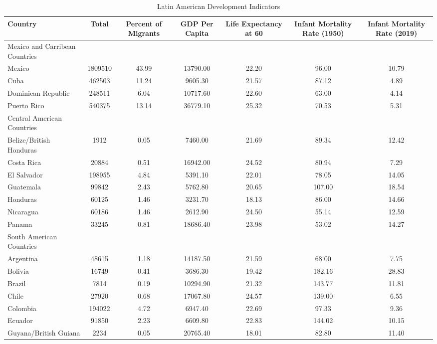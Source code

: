 \begin{table}[ht]
\centering
\caption{Latin American Development Indicators} 
\begin{tabular}{l|cccccc}
  \hline
Country & Total & Percent of Migrants & GDP Per Capita & Life Expectancy at 60 & Infant Mortality Rate (1950) & Infant Mortality Rate (2019) \\ 
  \hline
Mexico and Carribean Countries &  &  &  &  &  &  \\ 
  Mexico & 1809510 & 43.99 & 13790.00 & 22.20 & 96.00 & 10.79 \\ 
  Cuba & 462503 & 11.24 & 9605.30 & 21.57 & 87.12 & 4.89 \\ 
  Dominican Republic & 248511 & 6.04 & 10717.60 & 22.60 & 63.00 & 4.14 \\ 
  Puerto Rico & 540375 & 13.14 & 36779.10 & 25.32 & 70.53 & 5.31 \\ 
  Central American Countries &  &  &  &  &  &  \\ 
  Belize/British Honduras & 1912 & 0.05 & 7460.00 & 21.69 & 89.34 & 12.42 \\ 
  Costa Rica & 20884 & 0.51 & 16942.00 & 24.52 & 80.94 & 7.29 \\ 
  El Salvador & 198955 & 4.84 & 5391.10 & 22.01 & 78.05 & 14.05 \\ 
  Guatemala & 99842 & 2.43 & 5762.80 & 20.65 & 107.00 & 18.54 \\ 
  Honduras & 60125 & 1.46 & 3231.70 & 18.13 & 86.00 & 14.66 \\ 
  Nicaragua & 60186 & 1.46 & 2612.90 & 24.50 & 55.14 & 12.59 \\ 
  Panama & 33245 & 0.81 & 18686.40 & 23.98 & 53.02 & 14.27 \\ 
  South American Countries &  &  &  &  &  &  \\ 
  Argentina & 48615 & 1.18 & 14187.50 & 21.59 & 68.00 & 7.75 \\ 
  Bolivia & 16749 & 0.41 & 3686.30 & 19.42 & 182.16 & 28.83 \\ 
  Brazil & 7814 & 0.19 & 10294.90 & 21.32 & 143.77 & 11.81 \\ 
  Chile & 27920 & 0.68 & 17067.80 & 24.57 & 139.00 & 6.55 \\ 
  Colombia & 194022 & 4.72 & 6947.40 & 22.69 & 97.33 & 9.36 \\ 
  Ecuador & 91850 & 2.23 & 6609.80 & 22.83 & 144.02 & 10.15 \\ 
  Guyana/British Guiana & 2234 & 0.05 & 20765.40 & 18.01 & 82.80 & 11.40 \\ 

\end{tabular}
\end{table}
